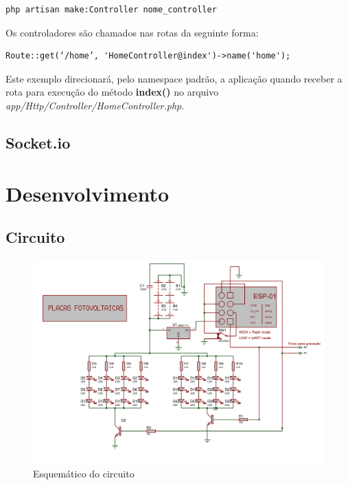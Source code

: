 \documentclass[
12pt,				%
openany,			%
twoside,			%
a4paper,			%
english,			%
french,				%
spanish,			%
brazil,				%
]{abntex2}
\begin{document}
\begin{lstlisting}[style=bash,caption={Criando um controller}]
    php artisan make:Controller nome_controller
\end{lstlisting}

Os controladores são chamados nas rotas da seguinte forma:

\begin{lstlisting}[style=php,caption={Prefixos de caminho}]
    Route::get(‘/home’, 'HomeController@index')->name('home'); 
\end{lstlisting}

Este exemplo direcionará, pelo namespace padrão, a aplicação quando receber a rota para execução do método \textbf{index()} no arquivo \textit{app/Http/Controller/HomeController.php}.

\chapter{Socket.io}

\part{Desenvolvimento}
\chapter{Circuito}
\begin{figure}[ht!]
    \includegraphics[width=450pt]{images/circuit.png}
    \caption{Esquemático do circuito}
\end{figure}
\end{document}
